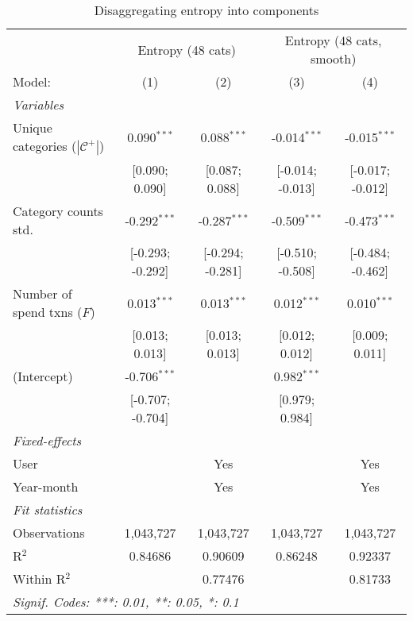 
\begin{table}[htbp]
   \centering
   \tiny
   \begin{threeparttable}[b]
      \caption{\label{tab:reg_comp_only} Disaggregating entropy into components}
      \begin{tabular}{lcccc}
         \tabularnewline \midrule \midrule
          & \multicolumn{2}{c}{Entropy (48 cats)} & \multicolumn{2}{c}{Entropy (48 cats, smooth)} \\ 
         Model:                                 & (1)              & (2)              & (3)              & (4)\\  
         \midrule
         \emph{Variables}\\
         Unique categories ($|\mathcal{C}^+|$)  & 0.090$^{***}$    & 0.088$^{***}$    & -0.014$^{***}$   & -0.015$^{***}$\\   
                                                & [0.090; 0.090]   & [0.087; 0.088]   & [-0.014; -0.013] & [-0.017; -0.012]\\   
         Category counts std.                   & -0.292$^{***}$   & -0.287$^{***}$   & -0.509$^{***}$   & -0.473$^{***}$\\   
                                                & [-0.293; -0.292] & [-0.294; -0.281] & [-0.510; -0.508] & [-0.484; -0.462]\\   
         Number of spend txns ($F$)             & 0.013$^{***}$    & 0.013$^{***}$    & 0.012$^{***}$    & 0.010$^{***}$\\   
                                                & [0.013; 0.013]   & [0.013; 0.013]   & [0.012; 0.012]   & [0.009; 0.011]\\   
         (Intercept)                            & -0.706$^{***}$   &                  & 0.982$^{***}$    &   \\   
                                                & [-0.707; -0.704] &                  & [0.979; 0.984]   &   \\   
         \midrule
         \emph{Fixed-effects}\\
         User                                   &                  & Yes              &                  & Yes\\  
         Year-month                             &                  & Yes              &                  & Yes\\  
         \midrule
         \emph{Fit statistics}\\
         Observations                           & 1,043,727        & 1,043,727        & 1,043,727        & 1,043,727\\  
         R$^2$                                  & 0.84686          & 0.90609          & 0.86248          & 0.92337\\  
         Within R$^2$                           &                  & 0.77476          &                  & 0.81733\\  
         \midrule \midrule
         \multicolumn{5}{l}{\emph{Signif. Codes: ***: 0.01, **: 0.05, *: 0.1}}\\
      \end{tabular}
   \end{threeparttable}
\end{table}


